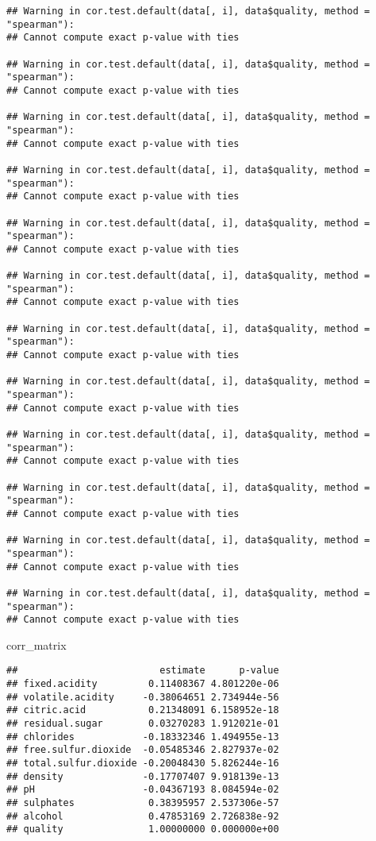 \documentclass[
]{article}
\newenvironment{Shaded}{\begin{snugshade}}{\end{snugshade}}
\newcommand{\NormalTok}[1]{#1}
\begin{document}
\begin{verbatim}
## Warning in cor.test.default(data[, i], data$quality, method = "spearman"):
## Cannot compute exact p-value with ties

## Warning in cor.test.default(data[, i], data$quality, method = "spearman"):
## Cannot compute exact p-value with ties

## Warning in cor.test.default(data[, i], data$quality, method = "spearman"):
## Cannot compute exact p-value with ties

## Warning in cor.test.default(data[, i], data$quality, method = "spearman"):
## Cannot compute exact p-value with ties

## Warning in cor.test.default(data[, i], data$quality, method = "spearman"):
## Cannot compute exact p-value with ties

## Warning in cor.test.default(data[, i], data$quality, method = "spearman"):
## Cannot compute exact p-value with ties

## Warning in cor.test.default(data[, i], data$quality, method = "spearman"):
## Cannot compute exact p-value with ties

## Warning in cor.test.default(data[, i], data$quality, method = "spearman"):
## Cannot compute exact p-value with ties

## Warning in cor.test.default(data[, i], data$quality, method = "spearman"):
## Cannot compute exact p-value with ties

## Warning in cor.test.default(data[, i], data$quality, method = "spearman"):
## Cannot compute exact p-value with ties

## Warning in cor.test.default(data[, i], data$quality, method = "spearman"):
## Cannot compute exact p-value with ties

## Warning in cor.test.default(data[, i], data$quality, method = "spearman"):
## Cannot compute exact p-value with ties
\end{verbatim}

\begin{Shaded}
\begin{Highlighting}[]
\NormalTok{corr\_matrix}
\end{Highlighting}
\end{Shaded}

\begin{verbatim}
##                         estimate      p-value
## fixed.acidity         0.11408367 4.801220e-06
## volatile.acidity     -0.38064651 2.734944e-56
## citric.acid           0.21348091 6.158952e-18
## residual.sugar        0.03270283 1.912021e-01
## chlorides            -0.18332346 1.494955e-13
## free.sulfur.dioxide  -0.05485346 2.827937e-02
## total.sulfur.dioxide -0.20048430 5.826244e-16
## density              -0.17707407 9.918139e-13
## pH                   -0.04367193 8.084594e-02
## sulphates             0.38395957 2.537306e-57
## alcohol               0.47853169 2.726838e-92
## quality               1.00000000 0.000000e+00
\end{verbatim}
\end{document}
